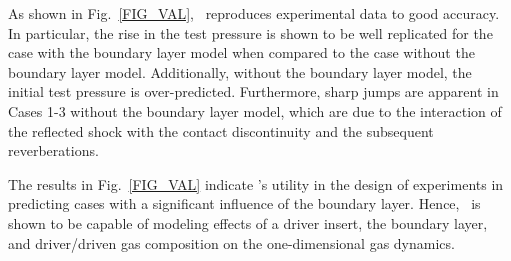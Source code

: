 As shown in Fig.~\ref{FIG_VAL}, \stnshk\ reproduces experimental data to good accuracy. In particular, the rise in the test pressure is shown to be well replicated for the case with the boundary layer model when compared to the case without the boundary layer model. Additionally, without the boundary layer model, the initial test pressure is over-predicted. Furthermore, sharp jumps are apparent in Cases 1-3 without the boundary layer model, which are due to the interaction of the reflected shock with the contact discontinuity and the subsequent reverberations.  

The results in Fig.~\ref{FIG_VAL} indicate \stnshk's utility in the design of experiments in predicting cases with a significant influence of the boundary layer. Hence, \stnshk\ is shown to be capable of modeling effects of a driver insert, the boundary layer, and driver/driven gas composition on the one-dimensional gas dynamics.   


